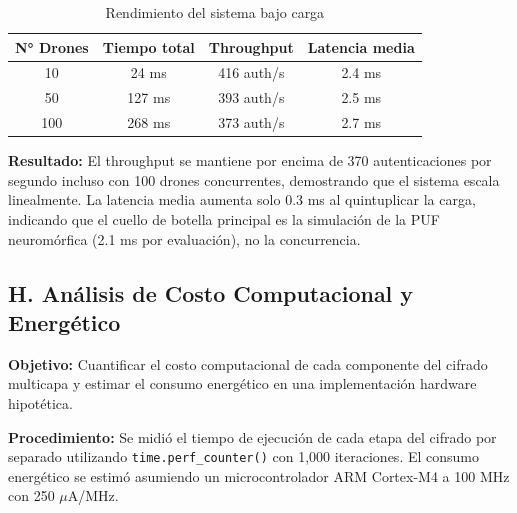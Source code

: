 \begin{table}[H]
    \centering\footnotesize\setlength{\tabcolsep}{3pt}
    \caption{Rendimiento del sistema bajo carga}
    \label{tab:scalability}
    \begin{tabular}{|c|c|c|c|}
        \hline
        \textbf{N° Drones} & \textbf{Tiempo total} & \textbf{Throughput} & \textbf{Latencia media} \\
        \hline
        10 & 24 ms & 416 auth/s & 2.4 ms \\
        50 & 127 ms & 393 auth/s & 2.5 ms \\
        100 & 268 ms & 373 auth/s & 2.7 ms \\
        \hline
    \end{tabular}
\end{table}

\textbf{Resultado:} El throughput se mantiene por encima de 370 autenticaciones por segundo incluso con 100 drones concurrentes, demostrando que el sistema escala linealmente. La latencia media aumenta solo 0.3 ms al quintuplicar la carga, indicando que el cuello de botella principal es la simulación de la PUF neuromórfica (2.1 ms por evaluación), no la concurrencia.

\subsection*{H. Análisis de Costo Computacional y Energético}

\textbf{Objetivo:} Cuantificar el costo computacional de cada componente del cifrado multicapa y estimar el consumo energético en una implementación hardware hipotética.

\textbf{Procedimiento:} Se midió el tiempo de ejecución de cada etapa del cifrado por separado utilizando \texttt{time.perf\_counter()} con 1,000 iteraciones. El consumo energético se estimó asumiendo un microcontrolador ARM Cortex-M4 a 100 MHz con 250 $\mu$A/MHz.

